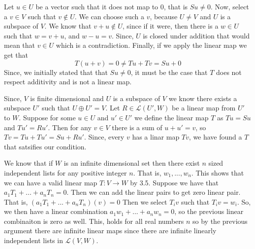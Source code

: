 \documentclass[10pt, twocolumn]{article}
\begin{document}
\begin{q}[10]
	Let $ u \in U $ be a vector such that it does not map to 0, that is $ Su \neq 0 $. 
	Now, select a $ v \in V $ such that $ v \not\in U $. 
	We can choose such a $ v $, because $ U \neq V $ and $ U $ is a subspace of $ V $. 
	We know that $ v + u \not\in U $, since if it were, then there is a $ w \in U $ such that $ w = v + u $, 
	and $ w - u = v $. 
	Since, $ U $ is closed under addition that would mean that $ v \in U $ which is a contradiction. 
	Finally, if we apply the linear map we get that 
	$$ T(u + v)	 = 0 \neq Tu + Tv = Su + 0 $$
	Since, we initially stated that that $ Su \neq 0 $, it must be the case that $ T $ does not respect additivity and is not a linear map. 
\end{q}
\begin{q}[11]
	Since, $ V $ is finite dimensional and $ U $ is a subspace of $ V $ we know there exists a subspace $ U' $
	such that $ U \oplus U' = V $. 
	Let $ R \in \mathcal{L}(U', W) $ be a linear map from $U'$ to $ W $. 
	Suppose for some $ u \in U $ and $ u' \in U'$ we define the linear map $ T $ as
	$ Tu = Su $ and $ Tu' = Ru' $. 
	Then for any $ v \in V $ there is a sum of $ u + u' = v $, so  $ Tv = Tu + Tu' = Su + Ru' $. 
	Since, every $ v $ has a linar map $ Tv $, we have found a $ T $ that satsifies our condition.
\end{q}
\begin{q}[12]
	We know that if $ W $ is an infinite dimensional set then there exist $ n $ sized independent lists for any positive integer $ n $. 
	That is, $ w_1, ..., w_n $.
	This shows that we can have a valid linear map $ T: V \to W $ by 3.5. 
	Suppose we have that $ a_1 T_1 + ... + a_n T_n = 0 $. 
	Then we can add the linear pairs to get zero linear pair. 
	That is, 
	$ (a_1 T_1 + ... + a_n T_n)(v) = 0 $
	Then we select $ T_i v $ such that $ T_i v = w_i $. 
	So, we then have a linear combination $ a_1 w_1 + ... + a_n w_n = 0 $, so the previous linear combinaiton is zero as well.
	This, holds for all real numbers $ n$ so by the previous argument there are  infinite linear maps since there are infinite linearly independent lists in $ \mathcal{L} (V, W) $.

\end{q}
\end{document}
